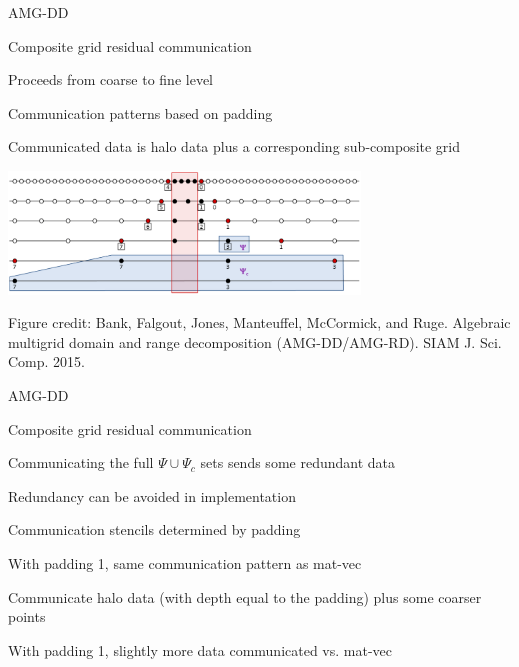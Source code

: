 \documentclass[18pt,xcolor=table]{beamer}
\begin{document}
\begin{frame}{AMG-DD}
\begin{block}{Composite grid residual communication}
\bit
\item Proceeds from coarse to fine level
\item Communication patterns based on padding
\item Communicated data is halo data plus a corresponding sub-composite grid
\eit
\end{block}
\begin{center}
\includegraphics[width=0.7\textwidth]{../figures/resComm}
\end{center}
\tiny{Figure credit: Bank, Falgout, Jones, Manteuffel, McCormick, and Ruge. Algebraic multigrid domain and range decomposition (AMG-DD/AMG-RD). SIAM J. Sci. Comp. 2015.}
\end{frame}

\begin{frame}{AMG-DD}
\begin{block}{Composite grid residual communication}
\bit
\item Communicating the full $\Psi \cup \Psi_c$ sets sends some redundant data
\item Redundancy can be avoided in implementation
\item Communication stencils determined by padding
\item With padding 1, same communication pattern as mat-vec
\item Communicate halo data (with depth equal to the padding) plus some coarser points
\item With padding 1, slightly more data communicated vs. mat-vec
\eit
\end{block}
\end{frame}
\end{document}
